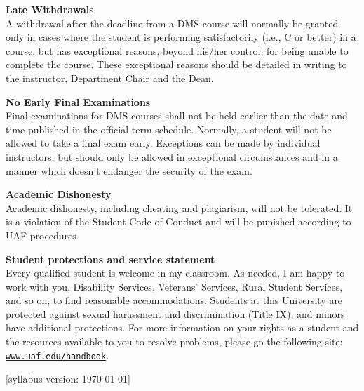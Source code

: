 \documentclass[12pt]{article}
\renewcommand{\emph}[1]{\textsf{\textbf{#1}}}
\newcommand{\localhead}[1]{\par\smallskip\textbf{#1} \smallskip\nobreak\\}%
\def\subheading#1{\localhead{\emph{#1}}}
\begin{document}
\subheading{Late Withdrawals} 
A withdrawal after the deadline from a DMS course will
  normally be granted only in cases where the student is performing
  satisfactorily (i.e., C or better) in a course, but has exceptional
  reasons, beyond his/her control, for being unable to complete the
  course.  These exceptional reasons should be detailed in writing to
  the instructor, Department Chair and the Dean.

\subheading{No Early Final Examinations}
Final examinations for DMS courses shall not be held earlier than the date and time published in the official term schedule.  Normally, a student will not be allowed to take a final exam early.  Exceptions can be made by individual instructors, but should only be allowed in exceptional circumstances and in a manner which doesn't endanger the security of the exam.

\subheading{Academic Dishonesty}
Academic dishonesty, including cheating and plagiarism, will not be tolerated.  It is a violation of the Student Code of Conduct and will be punished according to UAF procedures.

\subheading{Student protections and service statement}
Every qualified student is welcome in my classroom.  As needed, I am happy to work with you, Disability Services, Veterans' Services, Rural Student Services, and so on, to find reasonable accommodations.  Students at this University are protected against sexual harassment and discrimination (Title IX), and minors have additional protections.  For more information on your rights as a student and the resources available to you to resolve problems, please go the following site: \href{https://www.uaf.edu/handbook/}{\texttt{www.uaf.edu/handbook}}.

\hfill  \scriptsize [syllabus version: \today] \normalsize
\end{document}
